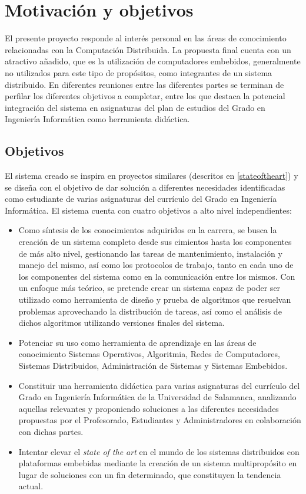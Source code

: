 \chapter{Motivación y objetivos}

El presente proyecto responde al interés personal en las áreas de conocimiento relacionadas con la Computación Distribuida. La propuesta final cuenta con un atractivo añadido, que es la utilización de computadores embebidos, generalmente no utilizados para este tipo de propósitos, como integrantes de un sistema distribuido. En diferentes reuniones entre las diferentes partes se terminan de perfilar los diferentes objetivos a completar, entre los que destaca la potencial integración del sistema en asignaturas del plan de estudios del Grado en Ingeniería Informática como herramienta didáctica.

\section{Objetivos}

El sistema creado se inspira en proyectos similares (descritos en \ref{stateoftheart}) y se diseña con el objetivo de dar solución a diferentes necesidades identificadas como estudiante de varias asignaturas del currículo del Grado en Ingeniería Informática. El sistema cuenta con cuatro objetivos a alto nivel independientes:

\begin{itemize}
	\item Como síntesis de los conocimientos adquiridos en la carrera, se busca la creación de un sistema completo desde sus cimientos hasta los componentes de más alto nivel, gestionando las tareas de mantenimiento, instalación y manejo del mismo, así como los protocolos de trabajo, tanto en cada uno de los componentes del sistema como en la comunicación entre los mismos. Con un enfoque más teórico, se pretende crear un sistema capaz de poder ser utilizado como herramienta de diseño y prueba de algoritmos que resuelvan problemas aprovechando la distribución de tareas, así como el análisis de dichos algoritmos utilizando versiones finales del sistema.

	\item Potenciar su uso como herramienta de aprendizaje en las áreas de conocimiento Sistemas Operativos, Algoritmia, Redes de Computadores, Sistemas Distribuidos, Administración de Sistemas y Sistemas Embebidos.
	
	\item Constituir una herramienta didáctica para varias asignaturas del currículo del Grado en Ingeniería Informática de la Universidad de Salamanca, analizando aquellas relevantes y proponiendo soluciones a las diferentes necesidades propuestas por el Profesorado, Estudiantes y Administradores en colaboración con dichas partes.

	\item Intentar elevar el \textit{state of the art} en el mundo de los sistemas distribuidos con plataformas embebidas mediante la creación de un sistema multipropósito en lugar de soluciones con un fin determinado, que constituyen la tendencia actual.
\end{itemize}


